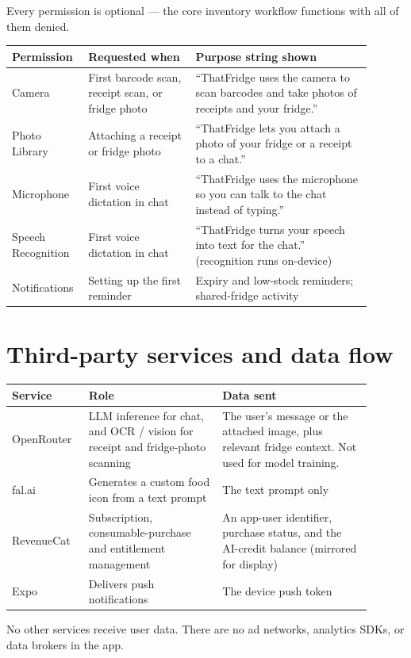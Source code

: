\documentclass[11pt]{article}
\begin{document}
Every permission is optional --- the core inventory workflow functions with all of them
denied.

\begin{tabular}{@{}L{0.16\linewidth} L{0.28\linewidth} L{0.46\linewidth}@{}}
\toprule
Permission & Requested when & Purpose string shown \\
\midrule
Camera & First barcode scan, receipt scan, or fridge photo & ``ThatFridge uses the camera to scan barcodes and take photos of receipts and your fridge.'' \\
Photo Library & Attaching a receipt or fridge photo & ``ThatFridge lets you attach a photo of your fridge or a receipt to a chat.'' \\
Microphone & First voice dictation in chat & ``ThatFridge uses the microphone so you can talk to the chat instead of typing.'' \\
Speech Recognition & First voice dictation in chat & ``ThatFridge turns your speech into text for the chat.'' (recognition runs on-device) \\
Notifications & Setting up the first reminder & Expiry and low-stock reminders; shared-fridge activity \\
\bottomrule
\end{tabular}

\section{Third-party services and data flow}
\label{sec:third-party}

\begin{tabular}{@{}L{0.18\linewidth} L{0.34\linewidth} L{0.38\linewidth}@{}}
\toprule
Service & Role & Data sent \\
\midrule
OpenRouter & LLM inference for chat, and OCR / vision for receipt and fridge-photo scanning &
The user's message or the attached image, plus relevant fridge context. Not used for model
training. \\
fal.ai & Generates a custom food icon from a text prompt & The text prompt only \\
RevenueCat & Subscription, consumable-purchase and entitlement management & An app-user
identifier, purchase status, and the AI-credit balance (mirrored for display) \\
Expo & Delivers push notifications & The device push token \\
\bottomrule
\end{tabular}

\vspace{4pt}
No other services receive user data. There are no ad networks, analytics SDKs, or data
brokers in the app.
\end{document}
